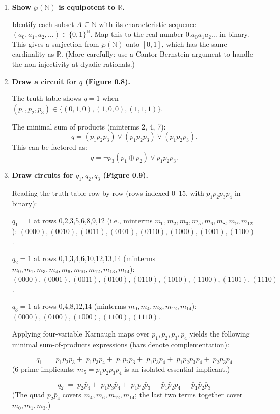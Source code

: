\documentclass[11pt]{book}
\def\NN{\mathbb{N}}
\def\RN{\mathbb{R}}
\begin{document}
\begin{enumerate}[{0.}1. ]
\item \textbf{Show $\wp(\NN)$ is equipotent to $\RN$.}

Identify each subset $A\subseteq\NN$ with its characteristic sequence $(a_0,a_1,a_2,\ldots)\in\{0,1\}^\NN$. Map this to the real number $0.a_0a_1a_2\ldots$ in binary. This gives a surjection from $\wp(\NN)$ onto $[0,1]$, which has the same cardinality as $\RN$. (More carefully: use a Cantor-Bernstein argument to handle the non-injectivity at dyadic rationals.)

\item \textbf{Draw a circuit for $q$ (Figure 0.8).}

The truth table shows $q=1$ when $(p_1,p_2,p_3)\in\{(0,1,0),(1,0,0),(1,1,1)\}$.

The minimal sum of products (minterms 2, 4, 7):
\[
q = (\bar p_1 p_2\bar p_3)\vee(p_1\bar p_2\bar p_3)\vee(p_1 p_2 p_3).
\]
This can be factored as:
\[
q = \neg p_3(p_1\oplus p_2)\vee p_1 p_2 p_3.
\]

\item \textbf{Draw circuits for $q_1, q_2, q_3$ (Figure 0.9).}

Reading the truth table row by row (rows indexed 0--15, with $p_1p_2p_3p_4$ in binary):

\textit{$q_1 = 1$} at rows 0,2,3,5,6,8,9,12 (i.e., minterms $m_0,m_2,m_3,m_5,m_6,m_8,m_9,m_{12}$):
$(0000),(0010),(0011),(0101),(0110),(1000),(1001),(1100)$.

\textit{$q_2 = 1$} at rows 0,1,3,4,6,10,12,13,14 (minterms $m_0,m_1,m_3,m_4,m_6,m_{10},m_{12},m_{13},m_{14}$):
$(0000),(0001),(0011),(0100),(0110),(1010),(1100),(1101),(1110)$.

\textit{$q_3 = 1$} at rows 0,4,8,12,14 (minterms $m_0,m_4,m_8,m_{12},m_{14}$):
$(0000),(0100),(1000),(1100),(1110)$.

Applying four-variable Karnaugh maps over $p_1,p_2,p_3,p_4$ yields the following minimal sum-of-products expressions (bars denote complementation):

\[
q_1 \;=\; p_1\bar p_2\bar p_3
       +\; p_1\bar p_3\bar p_4
       +\; \bar p_1\bar p_2 p_3
       +\; \bar p_1 p_3\bar p_4
       +\; \bar p_1 p_2\bar p_3 p_4
       +\; \bar p_2\bar p_3\bar p_4
\]
(6 prime implicants; $m_5 = \bar p_1 p_2\bar p_3 p_4$ is an isolated essential implicant.)

\[
q_2 \;=\; p_2\bar p_4
       +\; p_1 p_3\bar p_4
       +\; p_1 p_2\bar p_3
       +\; \bar p_1\bar p_2 p_4
       +\; \bar p_1\bar p_2\bar p_3
\]
(The quad $p_2\bar p_4$ covers $m_4,m_6,m_{12},m_{14}$; the last two terms together cover $m_0,m_1,m_3$.)


\end{enumerate}
\end{document}
